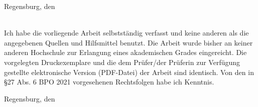 \vspace*{1cm}
\hspace*{4cm} Regensburg, den \submissiontime \hspace*{0.5cm}\hrulefill \\
\hspace*{10.5cm} \myname \\



Ich habe die vorliegende Arbeit selbstständig verfasst und keine anderen als die angegebenen Quellen und Hilfsmittel benutzt. Die Arbeit wurde bisher an keiner anderen Hochschule zur Erlangung eines akademischen Grades eingereicht. Die vorgelegten Druckexemplare und die dem Prüfer/der Prüferin zur Verfügung gestellte elektronische Version (PDF-Datei) der Arbeit sind identisch. Von den in §27 Abs. 6 BPO 2021 vorgesehenen Rechtsfolgen habe ich Kenntnis.


\vspace*{1cm}
\hspace*{4cm} Regensburg, den \submissiontime \hspace*{0.5cm}\hrulefill \\
\hspace*{10.5cm} \myname \\







